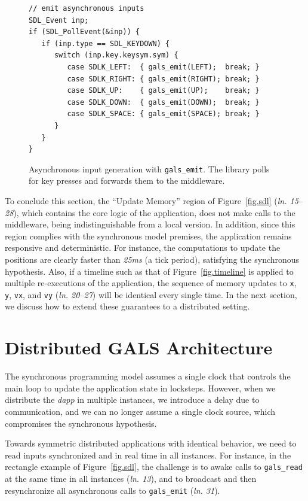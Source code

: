 \documentclass[sigplan,screen]{acmart}
\newcommand{\lin}[1]{(\emph{ln. #1}\xspace)}
\newcommand{\dapp}{\emph{dapp}\xspace}
\begin{document}
\begin{figure}[t]
{\scriptsize
\begin{verbatim}
// emit asynchronous inputs
SDL_Event inp;
if (SDL_PollEvent(&inp)) {
   if (inp.type == SDL_KEYDOWN) {
      switch (inp.key.keysym.sym) {
         case SDLK_LEFT:  { gals_emit(LEFT);  break; }
         case SDLK_RIGHT: { gals_emit(RIGHT); break; }
         case SDLK_UP:    { gals_emit(UP);    break; }
         case SDLK_DOWN:  { gals_emit(DOWN);  break; }
         case SDLK_SPACE: { gals_emit(SPACE); break; }
      }
   }
}
\end{verbatim}
}
  \caption{
    \label{fig.input}
    Asynchronous input generation with \texttt{gals\_emit}.
    The library polls for key presses and forwards them to the middleware.
  }
\end{figure}

To conclude this section, the ``Update Memory'' region of Figure~\ref{fig.sdl}
\lin{15--28}, which contains the core logic of the application, does not make
calls to the
middleware, being indistinguishable from a local version.
In addition, since this region complies with the synchronous model premises,
the application remains responsive and deterministic.
For instance, the computations to update the positions are clearly faster than
\emph{25ms} (a tick period), satisfying the synchronous hypothesis.
Also, if a timeline such as that of Figure~\ref{fig.timeline} is applied to
multiple re-executions of the application, the sequence of memory updates to
\texttt{x}, \texttt{y}, \texttt{vx}, and \texttt{vy} \lin{20--27} will be
identical every single time.
In the next section, we discuss how to extend these guarantees to a distributed
setting.

\section{Distributed GALS Architecture}
\label{sec.gals}

The synchronous programming model assumes a single clock that controls the main
loop to update the application state in locksteps.
However, when we distribute the \dapp in multiple instances, we introduce a
delay due to communication, and we can no longer assume a single clock source,
which compromises the synchronous hypothesis.

Towards symmetric distributed applications with identical behavior, we need to
read inputs synchronized and in real time in all instances.
For instance, in the rectangle example of Figure~\ref{fig.sdl}, the challenge
is
    to awake calls to \texttt{gals\_read} at the same time in all instances \lin{13}, and
    to broadcast and then resynchronize all asynchronous calls to \texttt{gals\_emit} \lin{31}.
\end{document}
